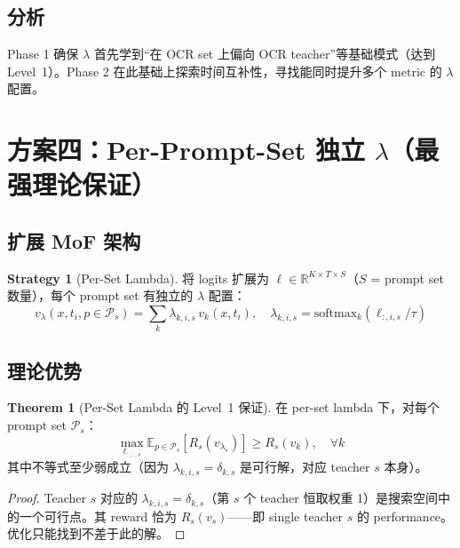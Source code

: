 \documentclass[11pt,a4paper]{article}
\newcommand{\E}{\mathbb{E}}
\newcommand{\R}{\mathbb{R}}
\newcommand{\softmax}{\mathrm{softmax}}
\theoremstyle{definition}
\newtheorem{theorem}{Theorem}
\newtheorem{strategy}{Strategy}
\begin{document}
\subsection{分析}

Phase 1 确保 $\lambda$ 首先学到``在 OCR set 上偏向 OCR teacher''等基础模式（达到 Level~1）。Phase 2 在此基础上探索时间互补性，寻找能同时提升多个 metric 的 $\lambda$ 配置。

\section{方案四：Per-Prompt-Set 独立 $\lambda$（最强理论保证）}
\label{sec:per_set_lambda}

\subsection{扩展 MoF 架构}

\begin{strategy}[Per-Set Lambda]
\label{strat:per_set}
将 logits 扩展为 $\ell \in \R^{K \times T \times S}$（$S$ = prompt set 数量），每个 prompt set 有独立的 $\lambda$ 配置：
\begin{equation}
v_\lambda(x, t_i, p \in \mathcal{P}_s) = \sum_k \lambda_{k,i,s}\, v_k(x, t_i), \quad
\lambda_{k,i,s} = \softmax_k(\ell_{:,i,s} / \tau)
\end{equation}
\end{strategy}

\subsection{理论优势}

\begin{theorem}[Per-Set Lambda 的 Level~1 保证]
\label{thm:per_set_level1}
在 per-set lambda 下，对每个 prompt set $\mathcal{P}_s$：
\begin{equation}
\max_{\ell_{:,:,s}} \E_{p \in \mathcal{P}_s}\left[R_s(v_{\lambda_s})\right] \geq R_s(v_k), \quad \forall k
\end{equation}
其中不等式至少弱成立（因为 $\lambda_{k,i,s} = \delta_{k,s}$ 是可行解，对应 teacher $s$ 本身）。
\end{theorem}

\begin{proof}
Teacher $s$ 对应的 $\lambda_{k,i,s} = \delta_{k,s}$（第 $s$ 个 teacher 恒取权重 1）是搜索空间中的一个可行点。其 reward 恰为 $R_s(v_s)$——即 single teacher $s$ 的 performance。优化只能找到不差于此的解。
\end{proof}
\end{document}
